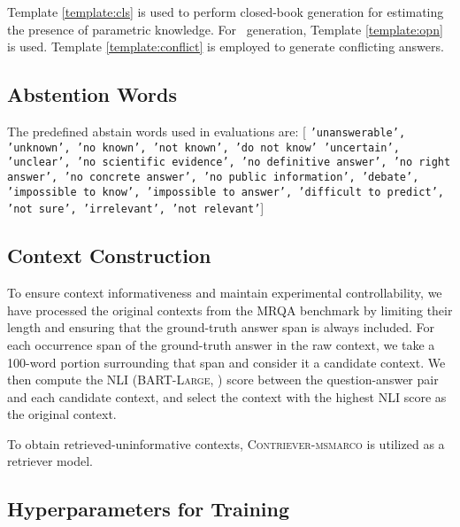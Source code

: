 




Template \ref{template:cls} is used to perform closed-book generation for estimating the presence of parametric knowledge.
For \naive\ generation, Template \ref{template:opn} is used.
Template \ref{template:conflict} is employed to generate conflicting answers.

\subsection{Abstention Words}

The predefined abstain words used in evaluations are: [
\texttt{'unanswerable',
    'unknown', 'no known', 'not known', 'do not know'
    'uncertain', 'unclear',
    'no scientific evidence',
    'no definitive answer', 'no right answer', 'no concrete answer',
    'no public information',
    'debate',
    'impossible to know', 'impossible to answer',
    'difficult to predict',
    'not sure',
    'irrelevant', 'not relevant'}]


\subsection{Context Construction}
\label{appendix:datasetConstruction}

To ensure context informativeness and maintain experimental controllability, we have processed the original contexts from the MRQA benchmark by limiting their length and ensuring that the ground-truth answer span is always included.
For each occurrence span of the ground-truth answer in the raw context, we take a 100-word portion surrounding that span and consider it a candidate context.
We then compute the NLI ({\scshape BART-Large}, \citealp{lewis-etal-2020-bart}) score between the question-answer pair and each candidate context, and select the context with the highest NLI score as the original context.

To obtain retrieved-uninformative contexts, {\scshape Contriever-msmarco} \citep{izacard2022unsupervised} is utilized as a retriever model.




\subsection{Hyperparameters for Training}

